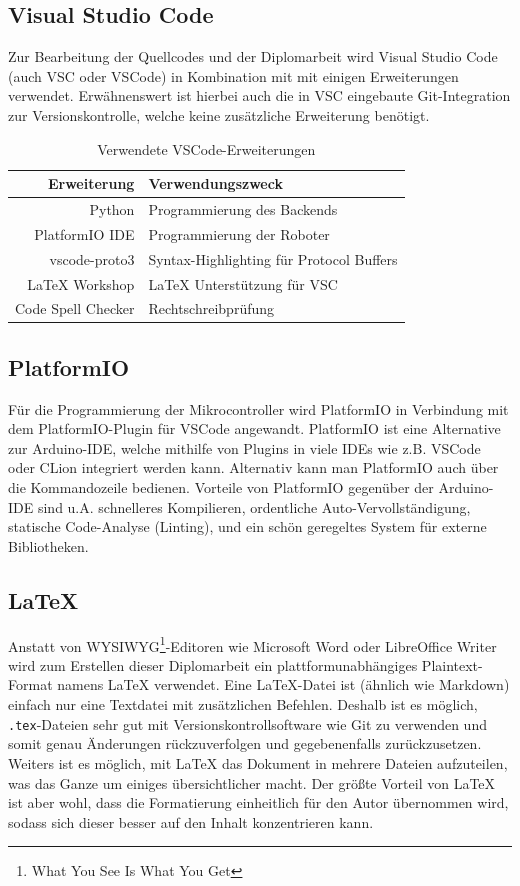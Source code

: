 \subsection{Visual Studio Code}
Zur Bearbeitung der Quellcodes und der Diplomarbeit wird Visual Studio Code (auch VSC oder VSCode)
in Kombination mit mit einigen Erweiterungen verwendet.
%
Erwähnenswert ist hierbei auch die in VSC eingebaute Git-Integration zur Versionskontrolle,
welche keine zusätzliche Erweiterung benötigt.
\begin{table}[H]
    \centering
    \begin{tabular}{r|l}
        Erweiterung         & Verwendungszweck \\ \hline
        Python              & Programmierung des Backends \\
        PlatformIO IDE      & Programmierung der Roboter \\
        vscode-proto3       & Syntax-Highlighting für Protocol Buffers \\
        LaTeX Workshop      & LaTeX Unterstützung für VSC \\
        Code Spell Checker  & Rechtschreibprüfung \\
    \end{tabular}
    \caption{Verwendete VSCode-Erweiterungen}
    \label{tab:vsc_plugins}
\end{table}
\subsection{PlatformIO}
Für die Programmierung der Mikrocontroller wird PlatformIO \cite{platformio}
in Verbindung mit dem PlatformIO-Plugin für VSCode angewandt.
%
PlatformIO ist eine Alternative zur Arduino-IDE,
welche mithilfe von Plugins in viele IDEs wie z.B. VSCode oder CLion integriert werden kann.
%
Alternativ kann man PlatformIO auch über die Kommandozeile bedienen.
%
Vorteile von PlatformIO gegenüber der Arduino-IDE sind u.A. schnelleres Kompilieren,
ordentliche Auto-Vervollständigung,
statische Code-Analyse (Linting),
und ein schön geregeltes System für externe Bibliotheken.

\subsection{\LaTeX}
\label{subsec:latex}
Anstatt von WYSIWYG\footnote{What You See Is What You Get}-Editoren
wie Microsoft Word oder LibreOffice Writer wird zum Erstellen dieser Diplomarbeit
ein plattformunabhängiges Plaintext-Format namens \LaTeX \cite{latex} verwendet.
Eine LaTeX-Datei ist (ähnlich wie Markdown) einfach nur eine Textdatei mit zusätzlichen Befehlen.
Deshalb ist es möglich, \texttt{.tex}-Dateien sehr gut mit Versionskontrollsoftware wie Git zu verwenden
und somit genau Änderungen rückzuverfolgen und gegebenenfalls zurückzusetzen.
%
Weiters ist es möglich, mit LaTeX das Dokument in mehrere Dateien aufzuteilen,
was das Ganze um einiges übersichtlicher macht.
%
Der größte Vorteil von LaTeX ist aber wohl,
dass die Formatierung einheitlich für den Autor übernommen wird,
sodass sich dieser besser auf den Inhalt konzentrieren kann.

